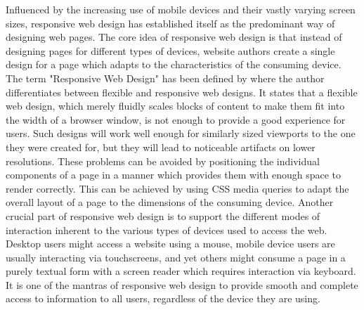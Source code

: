 Influenced by the increasing use of mobile devices and their vastly varying screen sizes, responsive web design has established itself as the predominant way of designing web pages. 
The core idea of responsive web design is that instead of designing pages for different types of devices, website authors create a single design for a page which adapts to the characteristics of the consuming device. 
The term "Responsive Web Design" has been defined by \cite{ResponsiveWebDesign} where the author differentiates between flexible and responsive web designs. 
It states that a flexible web design, which merely fluidly scales blocks of content to make them fit into the width of a browser window, is not enough to provide a good experience for users. 
Such designs will work well enough for similarly sized viewports to the one they were created for, but they will lead to noticeable artifacts on lower resolutions. 
These problems can be avoided by positioning the individual components of a page in a manner which provides them with enough space to render correctly.
This can be achieved by using CSS media queries to adapt the overall layout of a page to the dimensions of the consuming device. 
Another crucial part of responsive web design is to support the different modes of interaction inherent to the various types of devices used to access the web. 
Desktop users might access a website using a mouse, mobile device users are usually interacting via touchscreens, and yet others might consume a page in a purely textual form with a screen reader which requires interaction via keyboard. 
It is one of the mantras of responsive web design to provide smooth and complete access to information to all users, regardless of the device they are using. 
